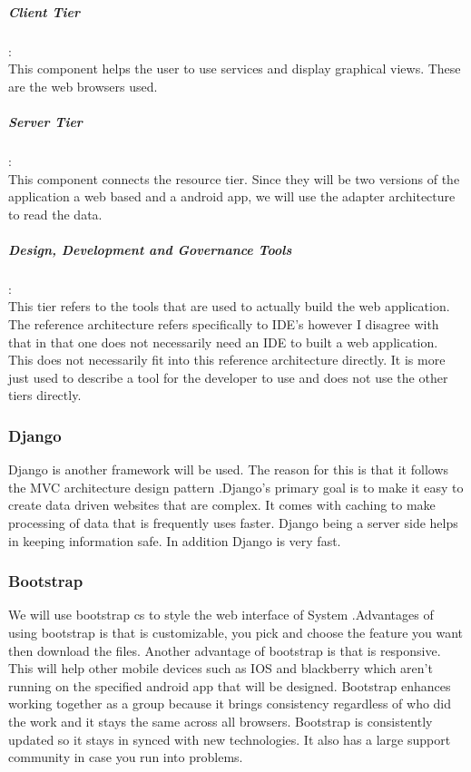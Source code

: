 \documentclass[a4paper,12pt]{article}
\begin{document}
\subparagraph{Client Tier}\hspace{-10pt}:\\
This component helps the user to use services and display graphical views. These are the web browsers used.

\subparagraph{Server Tier}\hspace{-10pt}:\\
This component connects the resource tier. Since they will be two versions of the application a web based and a android app, we will use the adapter architecture to read the data.

\subparagraph{Design, Development and Governance Tools}\hspace{-10pt}:\\
This tier refers to the tools that are used to actually build the web application. The reference architecture refers specifically to IDE's however I disagree with that in that one does not necessarily need an IDE to built a web application. This does not necessarily fit into this reference architecture directly. It is more just used to describe a tool for the developer to use and does not use the other tiers directly.

\subsubsection{Django}Django is another framework will be used. The reason for this is that it follows the MVC architecture design pattern .Django’s primary goal is to make it easy to create data driven websites that are complex. It comes with caching to make processing of data that is frequently uses faster. Django being a server side helps in keeping information safe. In addition Django is very fast.
\subsubsection{Bootstrap}We will use bootstrap cs to style the web interface of System .Advantages of using bootstrap  is that is customizable, you pick and choose the feature you want then download the files. Another advantage of bootstrap is that is responsive. This will help other mobile devices such as IOS and blackberry which aren’t running on the specified android app that will be designed. Bootstrap enhances working together as a group because it brings consistency regardless of who did the work and it stays the same across all browsers. Bootstrap is consistently updated so it stays in synced with new technologies. It also has a large support community in case you run into problems.\par 
\end{document}
